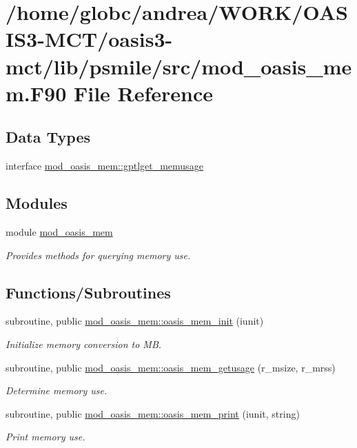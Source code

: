\hypertarget{mod__oasis__mem_8_f90}{}\section{/home/globc/andrea/\+W\+O\+R\+K/\+O\+A\+S\+I\+S3-\/\+M\+C\+T/oasis3-\/mct/lib/psmile/src/mod\+\_\+oasis\+\_\+mem.F90 File Reference}
\label{mod__oasis__mem_8_f90}
\subsection*{Data Types}
\begin{DoxyCompactItemize}
\item 
interface \hyperlink{interfacemod__oasis__mem_1_1gptlget__memusage}{mod\+\_\+oasis\+\_\+mem\+::gptlget\+\_\+memusage}
\end{DoxyCompactItemize}
\subsection*{Modules}
\begin{DoxyCompactItemize}
\item 
module \hyperlink{namespacemod__oasis__mem}{mod\+\_\+oasis\+\_\+mem}
\begin{DoxyCompactList}\small\item\em Provides methods for querying memory use. \end{DoxyCompactList}\end{DoxyCompactItemize}
\subsection*{Functions/\+Subroutines}
\begin{DoxyCompactItemize}
\item 
subroutine, public \hyperlink{namespacemod__oasis__mem_a104b7e7e85cd79e731a6e12a14358bbb}{mod\+\_\+oasis\+\_\+mem\+::oasis\+\_\+mem\+\_\+init} (iunit)
\begin{DoxyCompactList}\small\item\em Initialize memory conversion to MB. \end{DoxyCompactList}\item 
subroutine, public \hyperlink{namespacemod__oasis__mem_a2e20a40b48c7a7572f72da1b5d109ce3}{mod\+\_\+oasis\+\_\+mem\+::oasis\+\_\+mem\+\_\+getusage} (r\+\_\+msize, r\+\_\+mrss)
\begin{DoxyCompactList}\small\item\em Determine memory use. \end{DoxyCompactList}\item 
subroutine, public \hyperlink{namespacemod__oasis__mem_ac628b504553edbe9345cd070a8db2634}{mod\+\_\+oasis\+\_\+mem\+::oasis\+\_\+mem\+\_\+print} (iunit, string)
\begin{DoxyCompactList}\small\item\em Print memory use. \end{DoxyCompactList}\end{DoxyCompactItemize}
